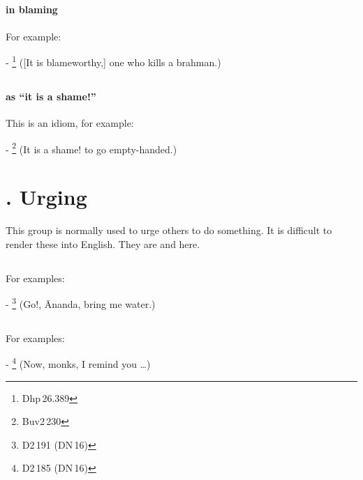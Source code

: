 \subsection*{}\label{nip:dhii}
\paragraph*{ in blaming} For example:\par
- \footnote{Dhp\,26.389} ([It is blameworthy,] one who kills a brahman.) \par

\subsection*{}\label{nip:kismidmviya}
\paragraph*{ as ``it is a shame!''} This is an idiom, for example:\par
- \footnote{Buv2\,230} (It is a shame! to go empty-handed.) \par

\label{nipgrp14}
\section*{. Urging}

This group is normally used to urge others to do something. It is difficult to render these into English. They are  and  here.

\subsection*{}\label{nip:ingha}
For examples:\par
- \footnote{D2\,191 (DN\,16)} (Go!, \=Ananda, bring me water.) \par

\subsection*{}\label{nip:handa}
For examples:\par
- \footnote{D2\,185 (DN\,16)} (Now, monks, I remind you \ldots) \par

